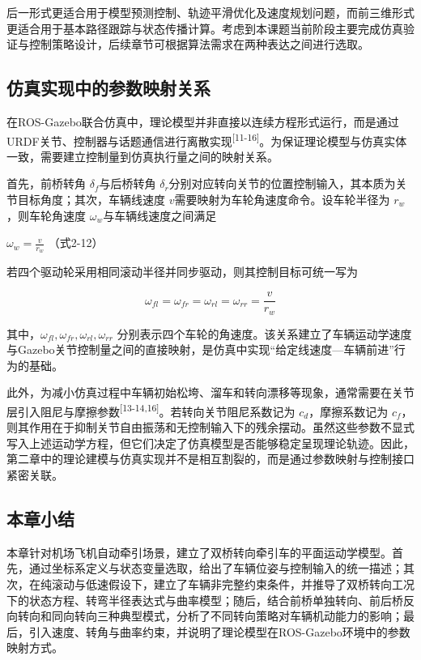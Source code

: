 \documentclass[UTF8,a4paper,12pt]{ctexart}
\begin{document}
后一形式更适合用于模型预测控制、轨迹平滑优化及速度规划问题，而前三维形式更适合用于基本路径跟踪与状态传播计算。考虑到本课题当前阶段主要完成仿真验证与控制策略设计，后续章节可根据算法需求在两种表达之间进行选取。

\subsection{仿真实现中的参数映射关系}\label{_Toc229105312}

在ROS-Gazebo联合仿真中，理论模型并非直接以连续方程形式运行，而是通过URDF关节、控制器与话题通信进行离散实现\textsuperscript{[11-16]}。为保证理论模型与仿真实体一致，需要建立控制量到仿真执行量之间的映射关系。

首先，前桥转角 \(\delta_{f}\)与后桥转角 \(\delta_{r}\)分别对应转向关节的位置控制输入，其本质为关节目标角度；其次，车辆线速度 \(v\)需要映射为车轮角速度命令。设车轮半径为 \(r_{w}\)，则车轮角速度 \(\omega_{w}\)与车辆线速度之间满足

\(\omega_{w} = \frac{v}{r_{w}}\) （式2-12）

若四个驱动轮采用相同滚动半径并同步驱动，则其控制目标可统一写为

\[\omega_{fl} = \omega_{fr} = \omega_{rl} = \omega_{rr} = \frac{v}{r_{w}}
\]

其中，\(\omega_{fl},\omega_{fr},\omega_{rl},\omega_{rr}\) 分别表示四个车轮的角速度。该关系建立了车辆运动学速度与Gazebo关节控制量之间的直接映射，是仿真中实现``给定线速度---车辆前进''行为的基础。

此外，为减小仿真过程中车辆初始松垮、溜车和转向漂移等现象，通常需要在关节层引入阻尼与摩擦参数\textsuperscript{[13-14,16]}。若转向关节阻尼系数记为 \(c_{d}\)，摩擦系数记为 \(c_{f}\)，则其作用在于抑制关节自由振荡和无控制输入下的残余摆动。虽然这些参数不显式写入上述运动学方程，但它们决定了仿真模型是否能够稳定呈现理论轨迹。因此，第二章中的理论建模与仿真实现并不是相互割裂的，而是通过参数映射与控制接口紧密关联。

\subsection{本章小结}\label{_Toc229105313}

本章针对机场飞机自动牵引场景，建立了双桥转向牵引车的平面运动学模型。首先，通过坐标系定义与状态变量选取，给出了车辆位姿与控制输入的统一描述；其次，在纯滚动与低速假设下，建立了车辆非完整约束条件，并推导了双桥转向工况下的状态方程、转弯半径表达式与曲率模型；随后，结合前桥单独转向、前后桥反向转向和同向转向三种典型模式，分析了不同转向策略对车辆机动能力的影响；最后，引入速度、转角与曲率约束，并说明了理论模型在ROS-Gazebo环境中的参数映射方式。
\end{document}
